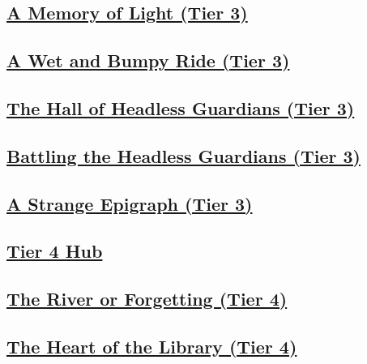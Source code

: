 \documentclass[sheet]{GL2020}
\begin{document}
\clearpage

\begin{center}\section*{\underline{A Memory of Light (Tier 3)}}\end{center}
\label{MemoryofLight}

\clearpage

\begin{center}\section*{\underline{A Wet and Bumpy Ride (Tier 3)}}\end{center}
\label{WetandBumpyRide}

\clearpage

\begin{center}\section*{\underline{The Hall of Headless Guardians (Tier 3)}}\end{center}
\label{HallofHeadlessGuardians}

\clearpage

\begin{center}\section*{\underline{Battling the Headless Guardians (Tier 3)}}\end{center}
\label{BattleHeadlessGuardians}

\clearpage

\begin{center}\section*{\underline{A Strange Epigraph (Tier 3)}}\end{center}
\label{StrangeEpigraph}

\clearpage

\begin{center}\section*{\underline{Tier 4 Hub}}\end{center}
\label{TierFourHub}

\clearpage

\begin{center}\section*{\underline{The River or Forgetting (Tier 4)}}\end{center}
\label{RiverofForgetting}

\clearpage

\begin{center}\section*{\underline{The Heart of the Library (Tier 4)}}\end{center}
\label{HeartoftheLibrary}

\clearpage
\end{document}
